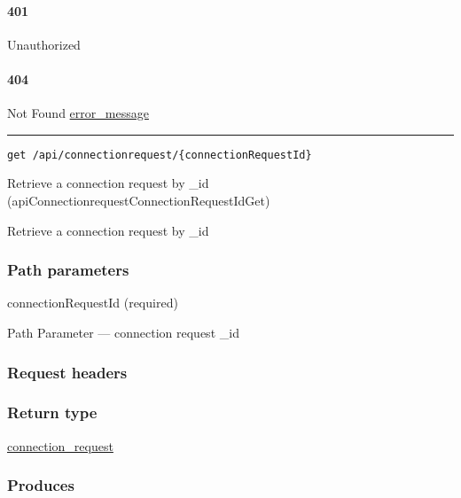 \hypertarget{section-513}{%
\paragraph{401}\label{section-513}}

Unauthorized \protect\hyperlink{}{}

\hypertarget{section-514}{%
\paragraph{404}\label{section-514}}

Not Found \protect\hyperlink{error_message}{error\_message}

\begin{center}\rule{0.5\linewidth}{\linethickness}\end{center}

\protect\hypertarget{apiConnectionrequestConnectionRequestIdGet}{}{}

\begin{verbatim}
get /api/connectionrequest/{connectionRequestId}
\end{verbatim}

Retrieve a connection request by \_id
({apiConnectionrequestConnectionRequestIdGet})

Retrieve a connection request by \_id

\hypertarget{path-parameters-87}{%
\subsubsection{Path parameters}\label{path-parameters-87}}

connectionRequestId (required)

{Path Parameter} --- connection request \_id

\hypertarget{request-headers-85}{%
\subsubsection{Request headers}\label{request-headers-85}}

\hypertarget{return-type-121}{%
\subsubsection{Return type}\label{return-type-121}}

\protect\hyperlink{connection_request}{connection\_request}

\hypertarget{produces-155}{%
\subsubsection{Produces}\label{produces-155}}

